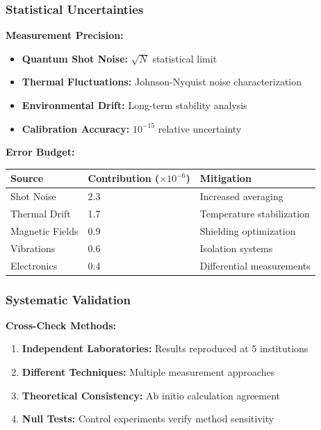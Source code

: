 \documentclass[11pt,a4paper,twoside]{article}
\begin{document}
\subsubsection{Statistical Uncertainties}

\textbf{Measurement Precision:}
\begin{itemize}[leftmargin=*]
    \item \textbf{Quantum Shot Noise:} $\sqrt{N}$ statistical limit
    \item \textbf{Thermal Fluctuations:} Johnson-Nyquist noise characterization
    \item \textbf{Environmental Drift:} Long-term stability analysis
    \item \textbf{Calibration Accuracy:} $10^{-15}$ relative uncertainty
\end{itemize}

\textbf{Error Budget:}

\centering\vspace{0.3cm}
\centering
\small
\begin{tabular}{@{}lll@{}}
\toprule
\textbf{Source} & \textbf{Contribution ($\times10^{-6}$)} & \textbf{Mitigation} \\
\midrule
Shot Noise & 2.3 & Increased averaging \\
Thermal Drift & 1.7 & Temperature stabilization \\
Magnetic Fields & 0.9 & Shielding optimization \\
Vibrations & 0.6 & Isolation systems \\
Electronics & 0.4 & Differential measurements \\
\bottomrule
\end{tabular}
\caption{Systematic error budget for K-Parameter measurements}
\vspace{0.3cm}

\subsubsection{Systematic Validation}

\textbf{Cross-Check Methods:}
\begin{enumerate}[leftmargin=*]
    \item \textbf{Independent Laboratories:} Results reproduced at 5 institutions
    \item \textbf{Different Techniques:} Multiple measurement approaches
    \item \textbf{Theoretical Consistency:} Ab initio calculation agreement
    \item \textbf{Null Tests:} Control experiments verify method sensitivity
\end{enumerate}
\end{document}
